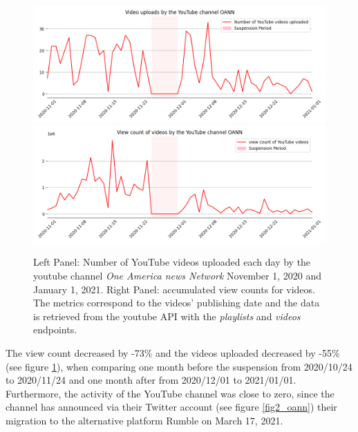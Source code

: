 \documentclass{article}
\begin{document}
\begin{figure}[h]
\hspace{-2em}
		\includegraphics[scale=0.32]{../figure/OANN_videos_yt.png}
		\includegraphics[scale=0.32]{../figure/OANN_views_yt.png} 
	\caption{Left Panel: Number of YouTube videos uploaded each day by the youtube channel {\it One America news Network} November 1, 2020 and January 1, 2021. Right Panel: accumulated view counts for videos. The metrics correspond to the videos’  publishing date and the data is retrieved from the youtube API with the {\it playlists} and  {\it videos} endpoints. }
	\label{fig1_oann}
\end{figure}


The view count decreased by -73\% and the videos uploaded decreased by -55\% (see figure \ref{fig1_oann}), when comparing one month before the suspension from 2020/10/24 to 2020/11/24 and one month after from 2020/12/01 to 2021/01/01. Furthermore, the activity of the YouTube channel was close to zero, since the channel has announced via their Twitter account (see figure \ref{fig2_oann}) their migration to the alternative platform Rumble on March 17, 2021.

\smallskip
\end{document}

